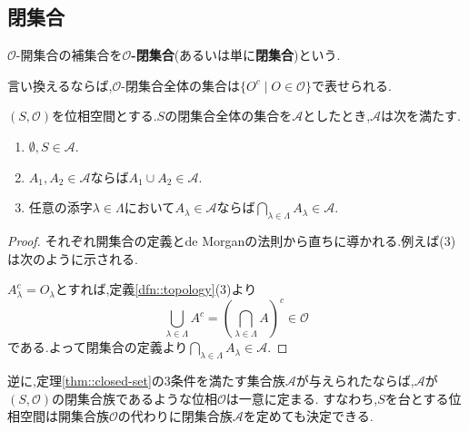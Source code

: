 \subsection{閉集合}

\begin{framed}
    \begin{dfn}[位相の定義と開集合]\label{dfn::closed-set}
        $\mathcal{O}$-開集合の補集合を\textbf{$\mathcal{O}$-閉集合}(あるいは単に\textbf{閉集合})という.
    \end{dfn}
\end{framed}

言い換えるならば,$\mathcal{O}$-閉集合全体の集合は$\{O^c\mid O\in\mathcal{O}\}$で表せられる.

\begin{framed}
    \begin{thm}[閉集合]\label{thm::closed-set}
        $(S,\mathcal{O})$を位相空間とする.$S$の閉集合全体の集合を$\mathcal{A}$としたとき,$\mathcal{A}$は次を満たす.

        \begin{enumerate}
            \item$\displaystyle\emptyset,S\in\mathcal{A}.$
            \item$A_1,A_2\in\mathcal{A}$ならば$A_1\cup A_2\in\mathcal{A}.$
            \item 任意の添字$\lambda\in\Lambda$において$A_\lambda\in\mathcal{A}$ならば$\displaystyle\bigcap_{\lambda\in\Lambda}A_\lambda\in\mathcal{A}.$
        \end{enumerate}
    \end{thm}
\end{framed}

\begin{proof}
    それぞれ開集合の定義とde Morganの法則から直ちに導かれる.例えば(3)は次のように示される.

    $A_\lambda^c=O_\lambda$とすれば,定義\ref{dfn::topology}(3)より
    $$\displaystyle\bigcup_{\lambda\in\Lambda}{A^c}=\left(\bigcap_{\lambda\in\Lambda}{A}\right)^c\in\mathcal{O}$$
    である.よって閉集合の定義より$\displaystyle\bigcap_{\lambda\in\Lambda}A_\lambda\in\mathcal{A}.$
\end{proof}

逆に,定理\ref{thm::closed-set}の3条件を満たす集合族$\mathcal{A}$が与えられたならば,$\mathcal{A}$が$(S,\mathcal{O})$の閉集合族であるような位相$\mathcal{O}$は一意に定まる.
すなわち,$S$を台とする位相空間は開集合族$\mathcal{O}$の代わりに閉集合族$\mathcal{A}$を定めても決定できる.

